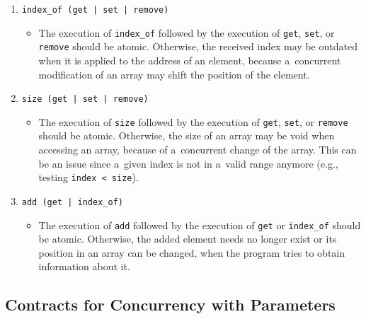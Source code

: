 \begin{example}
\begin{enumerate}[label={$ (\varrho_{\arabic*}) $}]
        \item
            \texttt{index\_of (get | set | remove)}
            \begin{itemize}[label=]
                \item
                    The execution of \texttt{index\_of} followed by the
                    execution of \texttt{get}, \texttt{set}, or
                    \texttt{remove} should be atomic. Otherwise, the received
                    index may be outdated when it is applied to the address
                    of an element, because a~concurrent modification of an
                    array may shift the position of the element.
            \end{itemize}

        \item
            \texttt{size (get | set | remove)}
            \begin{itemize}[label=]
                \item
                    The execution of \texttt{size} followed by the execution of
                    \texttt{get}, \texttt{set}, or \texttt{remove} should be
                    atomic. Otherwise, the size of an array may be void when
                    accessing an array, because of a~concurrent change of the
                    array. This can be an issue since a~given index is not in
                    a~valid range anymore (e.g., testing
                    \texttt{index < size}).
            \end{itemize}

        \item
            \texttt{add (get | index\_of)}
            \begin{itemize}[label=]
                \item
                    The execution of \texttt{add} followed by the execution of
                    \texttt{get} or \texttt{index\_of} should be atomic.
                    Otherwise, the added element needs no longer exist or its
                    position in an array can be changed, when the program
                    tries to obtain information about it.
            \end{itemize}
    \end{enumerate}
\end{example}

\subsection{Contracts for Concurrency with Parameters}
\label{sec:contractsParams}

